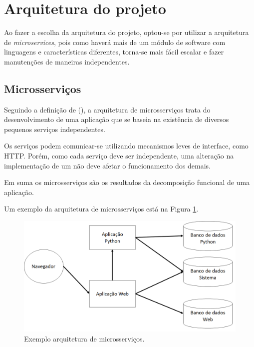 \section{Arquitetura do projeto}

Ao fazer a escolha da arquitetura do projeto, optou-se por utilizar a arquitetura de \textit{microservices}, pois como haverá mais de um módulo de software com linguagens e características diferentes, torna-se mais fácil escalar e fazer manutenções de maneiras independentes.

\subsection{Microsserviços}
Seguindo a definição de \citeauthor{ms1} (\citeyear{ms1}), a arquitetura de microsserviços trata do desenvolvimento de uma aplicação que se baseia na existência de diversos pequenos serviços independentes. 

Os serviços podem comunicar-se utilizando mecanismos leves de interface, como HTTP. Porém, como cada serviço deve ser independente, uma alteração na implementação de um não deve afetar o funcionamento dos demais. \cite{Pahl}

Em suma os microsserviços são os resultados da decomposição funcional de uma aplicação. 

Um exemplo da arquitetura de microsserviços está na Figura \ref{fig:arquitetura-microsservicos}.

\begin{figure}[htbp]
	\centering
	\includegraphics[width=1\linewidth]{figuras/WebService/microservices.png}
	\caption{Exemplo arquitetura de microsserviços.}
	\label{fig:arquitetura-microsservicos}
\end{figure}

 






